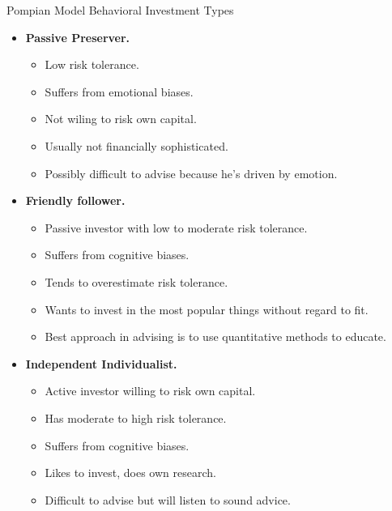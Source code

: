 \documentclass[../custom]{flashcards}
\begin{document}

\newcommand{\studyArea}{Behavioral Finance}

\begin{flashcard}[\studyArea]{Pompian Model Behavioral Investment Types}
    \begin{itemize}[nosep]
        \item \textbf{Passive Preserver.}
            \begin{itemize}[nosep]
                \item Low risk tolerance.
                \item Suffers from emotional biases.
                \item Not wiling to risk own capital.
                \item Usually not financially sophisticated.
                \item Possibly difficult to advise because he's driven by emotion.
            \end{itemize}
        \item \textbf{Friendly follower.}
            \begin{itemize}[nosep]
                \item Passive investor with low to moderate risk tolerance.
                \item Suffers from cognitive biases.
                \item Tends to overestimate risk tolerance.
                \item Wants to invest in the most popular things without regard to fit.
                \item Best approach in advising is to use quantitative methods to educate.
            \end{itemize}
        \item \textbf{Independent Individualist.}
            \begin{itemize}[nosep]
                \item Active investor willing to risk own capital.
                \item Has moderate to high risk tolerance.
                \item Suffers from cognitive biases.
                \item Likes to invest, does own research.
                \item Difficult to advise but will listen to sound advice.
            \end{itemize}

\end{itemize}
\end{flashcard}
\end{document}
